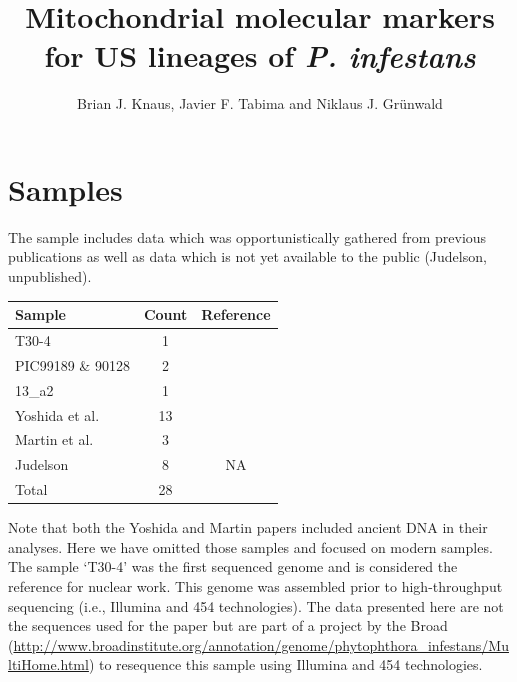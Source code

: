 \documentclass{article}\usepackage[]{graphicx}\usepackage[]{color}
\author{Brian J. Knaus, Javier F. Tabima and Niklaus J. Gr\"{u}nwald}
\title{Mitochondrial molecular markers for US lineages of \emph{P. infestans}}
\begin{document}

\maketitle
\newpage


\tableofcontents
\listoffigures
\listoftables

\newpage



\section{Samples}

The sample includes data which was opportunistically gathered from previous publications as well as data which is not yet available to the public (Judelson, unpublished).

\vspace{12pt}

\begin{center}
\begin{tabular}{ l c c }
  \hline
  Sample & Count & Reference \\
  \hline
  T30-4 & 1 & \cite{haas2009genome} \\
  PIC99189 \& 90128 & 2 & \cite{raffaele2010analyses} \\
  13\_a2 & 1 & \cite{cooke2012genome} \\
  Yoshida et al. & 13 & \cite{yoshida2013correction} \\
  Martin et al. & 3 & \cite{martin2013reconstructing} \\
  Judelson & 8 & NA \\
  \hline
  Total & 28 & \\
  \hline
\end{tabular}
\end{center}

\vspace{12pt}

Note that both the Yoshida and Martin papers \cite{yoshida2013correction, martin2013reconstructing} included ancient DNA in their analyses.  Here we have omitted those samples and focused on modern samples.  The sample `T30-4' was the first sequenced genome and is considered the reference for nuclear work.  This genome was assembled prior to high-throughput sequencing (i.e., Illumina and 454 technologies).  The data presented here are not the sequences used for the paper but are part of a project by the Broad (\url{http://www.broadinstitute.org/annotation/genome/phytophthora_infestans/MultiHome.html}) to resequence this sample using Illumina and 454 technologies.
\end{document}
